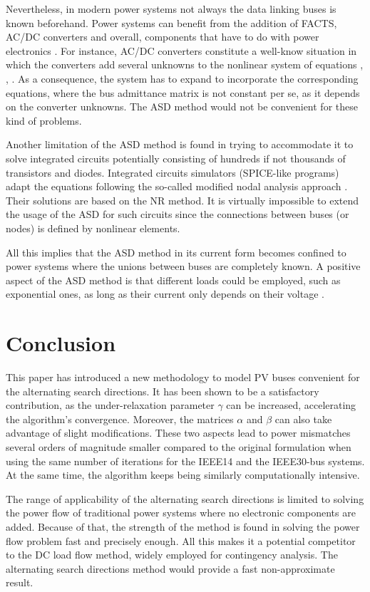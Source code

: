 \documentclass[journal]{IEEEtran}
\begin{document}
Nevertheless, in modern power systems not always the data linking buses is known beforehand. Power systems can benefit from the addition of FACTS, AC/DC converters and overall, components that have to do with power electronics \cite{arrillaga}. For instance, AC/DC converters constitute a well-know situation in which the converters add several unknowns to the nonlinear system of equations \cite{alvarez1}, \cite{alvarez2}, \cite{alvarez3}. As a consequence, the system has to expand to incorporate the corresponding equations, where the bus admittance matrix is not constant per se, as it depends on the converter unknowns. The ASD method would not be convenient for these kind of problems.

Another limitation of the ASD method is found in trying to accommodate it to solve integrated circuits potentially consisting of hundreds if not thousands of transistors and diodes. Integrated circuits simulators (SPICE-like programs) adapt the equations following the so-called modified nodal analysis approach \cite{hajj}. Their solutions are based on the NR method. It is virtually impossible to extend the usage of the ASD for such circuits since the connections between buses (or nodes) is defined by nonlinear elements. 

All this implies that the ASD method in its current form becomes confined to power systems where the unions between buses are completely known. A positive aspect of the ASD method is that different loads could be employed, such as exponential ones, as long as their current only depends on their voltage \cite{asd}. 


\section{Conclusion}\label{sec4}
This paper has introduced a new methodology to model PV buses convenient for the alternating search directions. It has been shown to be a satisfactory contribution, as the under-relaxation parameter $\gamma$ can be increased, accelerating the algorithm's convergence. Moreover, the matrices $\alpha$ and $\beta$ can also take advantage of slight modifications. These two aspects lead to power mismatches several orders of magnitude smaller compared to the original formulation when using the same number of iterations for the IEEE14 and the IEEE30-bus systems. At the same time, the algorithm keeps being similarly computationally intensive. 

The range of applicability of the alternating search directions is limited to solving the power flow of traditional power systems where no electronic components are added. Because of that, the strength of the method is found in solving the power flow problem fast and precisely enough. All this makes it a potential competitor to the DC load flow method, widely employed for contingency analysis. The alternating search directions method would provide a fast non-approximate result.
\end{document}
